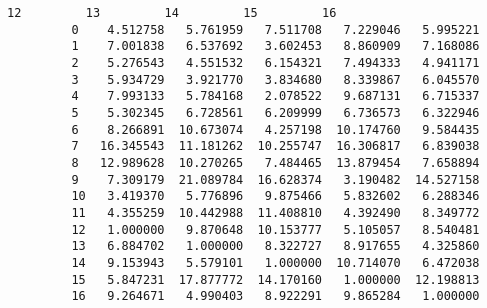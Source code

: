 \documentclass[11pt]{article}
\begin{document}
\begin{Verbatim}[commandchars=\\\{\}]
                    12         13         14         15         16  
         0    4.512758   5.761959   7.511708   7.229046   5.995221  
         1    7.001838   6.537692   3.602453   8.860909   7.168086  
         2    5.276543   4.551532   6.154321   7.494333   4.941171  
         3    5.934729   3.921770   3.834680   8.339867   6.045570  
         4    7.993133   5.784168   2.078522   9.687131   6.715337  
         5    5.302345   6.728561   6.209999   6.736573   6.322946  
         6    8.266891  10.673074   4.257198  10.174760   9.584435  
         7   16.345543  11.181262  10.255747  16.306817   6.839038  
         8   12.989628  10.270265   7.484465  13.879454   7.658894  
         9    7.309179  21.089784  16.628374   3.190482  14.527158  
         10   3.419370   5.776896   9.875466   5.832602   6.288346  
         11   4.355259  10.442988  11.408810   4.392490   8.349772  
         12   1.000000   9.870648  10.153777   5.105057   8.540481  
         13   6.884702   1.000000   8.322727   8.917655   4.325860  
         14   9.153943   5.579101   1.000000  10.714070   6.472038  
         15   5.847231  17.877772  14.170160   1.000000  12.198813  
         16   9.264671   4.990403   8.922291   9.865284   1.000000  
\end{Verbatim}
            
\end{document}
